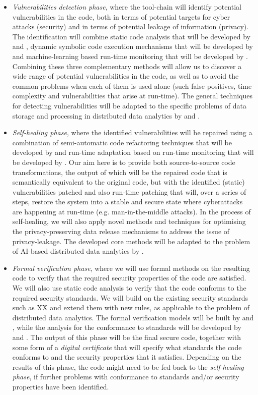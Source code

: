\documentclass[a4paper,11pt]{article}
\begin{document}
\begin{itemize}
\item \emph{Vulnerabilities detection phase}, where the tool-chain will identify potential vulnerabilities in the code, both in terms of potential targets for cyber attacks (security) and in terms of potential leakage of information (privacy). The identification will combine static code analysis that will be developed by \YAGshort{} and \UCMshort{}, dynamic symbolic code execution mechanisms that will be developed by \IBMshort{} and machine-learning based run-time monitoring that will be developed by \SCCHshort{}. Combining these three complementary methods will allow us to discover a wide range of potential vulnerabilities in the code, as well as to avoid the common problems when each of them is used alone (such false positives, time complexity and vulnerabilities that arise at run-time). The general techniques for detecting vulnerabilities will be adapted to the specific problems of data storage and processing in distributed data analytics by \UODshort{} and \SCCHshort{}. 

\item \emph{Self-healing phase}, where the identified vulnerabilities will be repaired using a combination of semi-automatic code refactoring techniques that will be developed by \SAshort{} and run-time adaptation based on run-time monitoring that will be developed by \SCCHshort{}. Our aim here is to provide both source-to-source code transformations, the output of which will be the repaired code that is semantically equivalent to the original code, but with the identified (static) vulnerabilities patched and also run-time patching that will, over a series of steps, restore the system into a stable and secure state where cyberattacks are happening at run-time (e.g. man-in-the-middle attacks). In the process of self-healing, we will also apply novel methods and techniques for optimising the privacy-preserving data release mechanisms to address the issue of privacy-leakage. The developed core methods will be adapted to the problem of AI-based distributed data analytics by \UODshort{}. 


\item \emph{Formal verification phase}, where we will use formal methods on the resulting code to verify that the required security properties of the code are satisfied. We will also use static code analysis to verify that the code conforms to the required security standards. We will build on the existing security standards such as XX and extend them with new rules, as applicable to the problem of distributed data analytics. The formal verification models will be built by \SCCHshort{} and \SAshort{}, while the analysis for the conformance to standards will be developed by \UCMshort{} and \YAGshort{}. The output of this phase will be the final secure code, together with some form of a \emph{digital certificate} that will specify what standards the code conforms to and the security properties that it satisfies. Depending on the results of this phase, the code might need to be fed back to the \emph{self-healing phase}, if further problems with conformance to standards and/or security properties have been identified.
\end{itemize}
\end{document}
